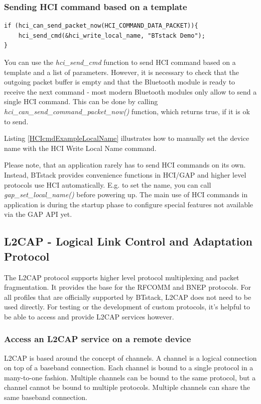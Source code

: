 \subsubsection{Sending HCI command based on a template}
\label{subsubsection:sendinghci}

\begin{lstlisting}[caption= Send hci\_write\_local\_name command that takes a string as a parameter., label=HCIcmdExampleLocalName]
if (hci_can_send_packet_now(HCI_COMMAND_DATA_PACKET)){
    hci_send_cmd(&hci_write_local_name, "BTstack Demo");
}  
\end{lstlisting}

You can use the \emph{hci\_send\_cmd} function to send HCI command based on a template and a list of parameters. However, it is necessary to check that the outgoing packet buffer is empty and that the Bluetooth module is ready to receive the next command - most modern Bluetooth modules only allow  to send a single HCI command. 
This can be done by calling \emph{hci\_can\_send\_command\_packet\_now()} function, which returns true, if it is ok to send.

Listing \ref{HCIcmdExampleLocalName} illustrates how to manually set the device name with the HCI Write Local Name command. 

Please note, that an application rarely has to send HCI commands on its own. Instead, BTstack provides convenience functions in HCI/GAP and higher level protocols use HCI automatically. E.g. to set the name, you can call \emph{gap\_set\_local\_name()} before powering up. The main use of HCI commands in application is during the startup phase to configure special features not available via the GAP API yet.



\subsection{L2CAP -  Logical Link Control and Adaptation Protocol}
The L2CAP protocol supports higher level protocol multiplexing and packet fragmentation. It provides the base for the RFCOMM and BNEP protocols. For all profiles that are officially supported by BTstack, L2CAP does not need to be used directly. For testing or the development of custom protocols, it's helpful to be able to access and provide L2CAP services however.

\subsubsection{Access an L2CAP service on a remote device}
L2CAP is based around the concept of channels. A channel is a logical connection on top of a baseband connection. Each channel is bound to a single protocol in a many-to-one fashion. Multiple channels can be bound to the same protocol, but a channel cannot be bound to multiple protocols. Multiple channels can share the same baseband connection.

